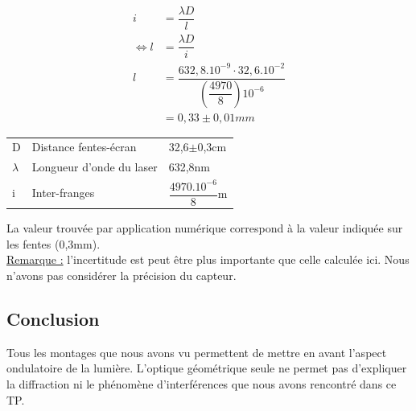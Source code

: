 \documentclass[12pt,a4paper]{article}
\begin{document}
	\begin{multicols}{2}
		\noindent
		\begin{align*}
		i&=\dfrac{\lambda D}{l}\\
		\iff l &= \dfrac{\lambda D}{i}\\
		l&=\dfrac{632,8.10^{-9}\cdot 32,6.10^{-2}}{\left(\dfrac{4970}{8}\right)10^{-6}}\\
		&=0,33\pm 0,01mm
		\end{align*}
		\columnbreak
		\vfill
		\begin{tabular}{lll}
			D & Distance fentes-écran & 32,6$\pm$0,3cm\\
			$\lambda$ & Longueur d'onde du laser & 632,8nm\\
			i & Inter-franges & $\dfrac{4970.10^{-6}}{8}$m
		\end{tabular}
	\end{multicols}
La valeur trouvée par application numérique correspond à la valeur indiquée sur les fentes (0,3mm).\\
\underline{Remarque :} l'incertitude est peut être plus importante que celle calculée ici. Nous n'avons pas considérer la précision du capteur.
\subsection{Conclusion}

Tous les montages que nous avons vu permettent de mettre en avant l'aspect ondulatoire de la lumière. L'optique géométrique seule ne permet pas d'expliquer la diffraction ni le phénomène d'interférences que nous avons rencontré dans ce TP.
\end{document}
